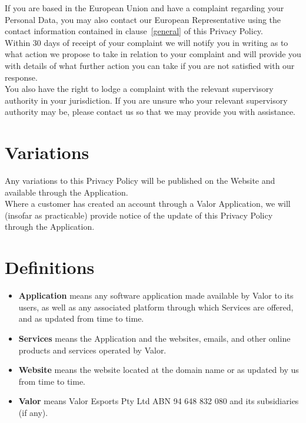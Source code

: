 \documentclass[10pt]{article}
\begin{document}
If you are based in the European Union and have a complaint regarding your Personal Data, you may also contact our European Representative using the contact information contained in clause~\ref{general} of this Privacy Policy. \\

Within 30 days of receipt of your complaint we will notify you in writing as to what action we propose to take in relation to your complaint and will provide you with details of what further action you can take if you are not satisfied with our response. \\

You also have the right to lodge a complaint with the relevant supervisory authority in your jurisdiction. If you are unsure who your relevant supervisory authority may be, please contact us so that we may provide you with assistance.


\section{Variations}
Any variations to this Privacy Policy will be published on the Website and available through the Application. \\

Where a customer has created an account through a Valor Application, we will (insofar as practicable) provide notice of the update of this Privacy Policy through the Application.


\section{Definitions}
\begin{itemize}
	\item[]
	\textbf{Application} means any software application made available by Valor to its users, as well as any associated platform through which Services are offered, and as updated from time to time.

	\item[]
	\textbf{Services} means the Application and the websites, emails, and other online products and services operated by Valor.

	\item[]
	\textbf{Website} means the website located at the domain name or as updated by us from time to time.

	\item[]	
	\textbf{Valor} means Valor Esports Pty Ltd ABN 94 648 832 080 and its subsidiaries (if any).
\end{itemize}
\end{document}
